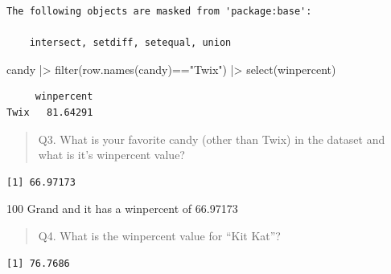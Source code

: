 \documentclass[
  letterpaper,
  DIV=11,
  numbers=noendperiod]{scrartcl}
\newenvironment{Shaded}{\begin{snugshade}}{\end{snugshade}}
\newcommand{\FunctionTok}[1]{\textcolor[rgb]{0.28,0.35,0.67}{#1}}
\newcommand{\NormalTok}[1]{\textcolor[rgb]{0.00,0.23,0.31}{#1}}
\newcommand{\SpecialCharTok}[1]{\textcolor[rgb]{0.37,0.37,0.37}{#1}}
\newcommand{\StringTok}[1]{\textcolor[rgb]{0.13,0.47,0.30}{#1}}
\begin{document}
\begin{verbatim}
The following objects are masked from 'package:base':

    intersect, setdiff, setequal, union
\end{verbatim}

\begin{Shaded}
\begin{Highlighting}[]
\NormalTok{candy }\SpecialCharTok{|\textgreater{}} 
  \FunctionTok{filter}\NormalTok{(}\FunctionTok{row.names}\NormalTok{(candy)}\SpecialCharTok{==}\StringTok{"Twix"}\NormalTok{) }\SpecialCharTok{|\textgreater{}} 
  \FunctionTok{select}\NormalTok{(winpercent)}
\end{Highlighting}
\end{Shaded}

\begin{verbatim}
     winpercent
Twix   81.64291
\end{verbatim}

\begin{quote}
Q3. What is your favorite candy (other than Twix) in the dataset and
what is it's winpercent value?
\end{quote}

\begin{Shaded}
\end{Shaded}

\begin{verbatim}
[1] 66.97173
\end{verbatim}

100 Grand and it has a winpercent of 66.97173

\begin{quote}
Q4. What is the winpercent value for ``Kit Kat''?
\end{quote}

\begin{Shaded}
\end{Shaded}

\begin{verbatim}
[1] 76.7686
\end{verbatim}
\end{document}
